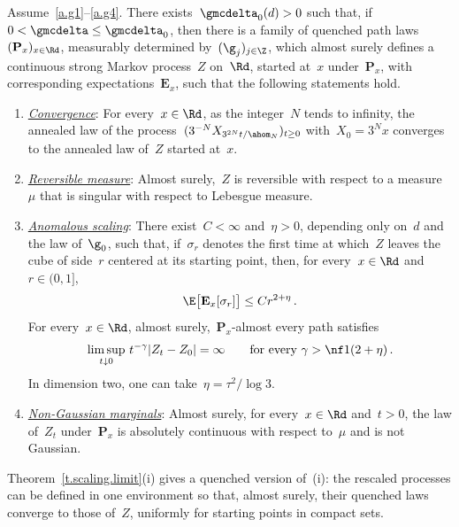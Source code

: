 \documentclass[11pt]{amsart}
\begin{document}
\begin{theoremA}
\label{t.A}
Assume~\ref{a.g1}--\ref{a.g4}. There exists~$\gmcdelta_0(d)>0$ such that, if~$0<\gmcdelta\leq\gmcdelta_0$, then there is a family of quenched path laws~$(\mathbf P_x)_{x\in\Rd}$, measurably determined by~$(\g_j)_{j\in\Z}$, which almost surely defines a continuous strong Markov process~$Z$ on~$\Rd$, started at~$x$ under~$\mathbf P_x$, with corresponding expectations~$\mathbf E_x$, such that the following statements hold.
\begin{enumerate}[label=(\roman*)]
\item \underline{\emph{Convergence}}: For every~$x\in\Rd$, as the integer~$N$ tends to infinity, the annealed law of the process~$(3^{-N}X_{3^{2N}t/\ahom_N})_{t\geq0}$ with~$X_0=3^Nx$ converges to the annealed law of~$Z$ started at~$x$.
\item \underline{\emph{Reversible measure}}: Almost surely,~$Z$ is reversible with respect to a measure~$\mu$ that is singular with respect to Lebesgue measure.
\item \underline{\emph{Anomalous scaling}}: There exist~$C<\infty$ and~$\eta>0$, depending only on~$d$ and the law of~$\g_0$, such that, if~$\sigma_r$ denotes the first time at which~$Z$ leaves the cube of side~$r$ centered at its starting point, then, for every~$x\in\Rd$ and~$r\in(0,1]$,
\begin{equation*}
	\E\bigl[\mathbf E_x[\sigma_r]\bigr]\leq Cr^{2+\eta}\,.
\end{equation*}
For every~$x\in\Rd$, almost surely,~$\mathbf P_x$-almost every path satisfies
\begin{equation*}
	\limsup_{t\downarrow0}\,t^{-\gamma}|Z_t-Z_0|=\infty
	\qquad\text{for every }\gamma>\nf1{(2+\eta)}\,.
\end{equation*}
In dimension two, one can take~$\eta=\tau^2/\log3$.
\item \underline{\emph{Non-Gaussian marginals}}: Almost surely, for every~$x\in\Rd$ and~$t>0$, the law of~$Z_t$ under~$\mathbf P_x$ is absolutely continuous with respect to~$\mu$ and is not Gaussian.
\end{enumerate}
\end{theoremA}

Theorem~\ref{t.scaling.limit}(i) gives a quenched version of~(i): the rescaled processes can be defined in one environment so that, almost surely, their quenched laws converge to those of~$Z$, uniformly for starting points in compact sets.

\smallskip
\end{document}
